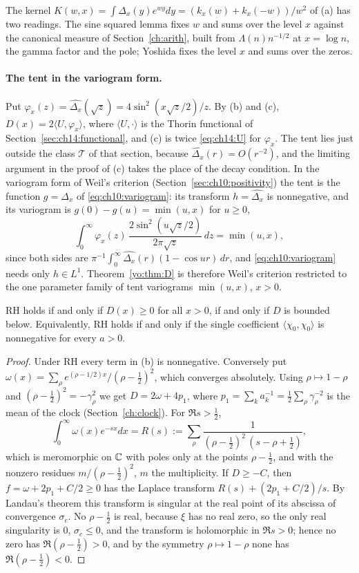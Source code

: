 The kernel $K(w,x)=\int\Delta_x(y)e^{wy}dy=(k_x(w)+k_x(-w))/w^2$ of (a) has two readings. The sine squared lemma fixes $w$ and sums over the level $x$ against the canonical measure of Section~\ref{ch:arith}, built from $\Lambda(n)n^{-1/2}$ at $x=\log n$, the gamma factor and the pole; Yoshida fixes the level $x$ and sums over the zeros.

\paragraph{The tent in the variogram form.} Put $\varphi_x(z)=\widehat{\Delta_x}(\sqrt z)=4\sin^2(x\sqrt z/2)/z$. By (b) and (c), $D(x)=2\langle U,\varphi_x\rangle$, where $\langle U,\cdot\rangle$ is the Thorin functional of Section~\ref{sec:ch14:functional}, and (c) is twice \eqref{eq:ch14:U} for $\varphi_x$. The tent lies just outside the class $\mathcal T$ of that section, because $\widehat{\Delta_x}(r)=O(r^{-2})$, and the limiting argument in the proof of (c) takes the place of the decay condition. In the variogram form of Weil's criterion (Section~\ref{sec:ch10:positivity}) the tent is the function $g=\Delta_x$ of \eqref{eq:ch10:variogram}: its transform $h=\widehat{\Delta_x}$ is nonnegative, and its variogram is $g(0)-g(u)=\min(u,x)$ for $u\ge0$,
\[
\int_0^\infty\varphi_x(z)\,\frac{2\sin^2(u\sqrt z/2)}{2\pi\sqrt z}\,dz=\min(u,x),
\]
since both sides are $\pi^{-1}\int_0^\infty\widehat{\Delta_x}(r)(1-\cos ur)\,dr$, and \eqref{eq:ch10:variogram} needs only $h\in L^1$. Theorem~\ref{yo:thm:D} is therefore Weil's criterion restricted to the one parameter family of tent variograms $\min(u,x)$, $x>0$.

\begin{theorem}\label{yo:thm:D}
RH holds if and only if $D(x)\ge0$ for all $x>0$, if and only if $D$ is bounded below. Equivalently, RH holds if and only if the single coefficient $\langle\chi_0,\chi_0\rangle$ is nonnegative for every $a>0$.
\end{theorem}

\begin{proof}
Under RH every term in (b) is nonnegative. Conversely put $\omega(x)=\sum_\rho e^{(\rho-1/2)x}/(\rho-\frac12)^2$, which converges absolutely. Using $\rho\mapsto1-\rho$ and $(\rho-\frac12)^2=-\gamma_\rho^2$ we get $D=2\omega+4p_1$, where $p_1=\sum_ka_k^{-1}=\frac12\sum_\rho\gamma_\rho^{-2}$ is the mean of the clock (Section~\ref{ch:clock}). For $\Re s>\frac12$,
\[
\int_0^\infty\omega(x)e^{-sx}dx=R(s):=\sum_\rho\frac1{(\rho-\frac12)^2\,(s-\rho+\frac12)},
\]
which is meromorphic on $\mathbb{C}$ with poles only at the points $\rho-\frac12$, and with the nonzero residues $m/(\rho-\frac12)^2$, $m$ the multiplicity. If $D\ge-C$, then $f=\omega+2p_1+C/2\ge0$ has the Laplace transform $R(s)+(2p_1+C/2)/s$. By Landau's theorem \cite[Chapter~II, Theorem~5b]{Widder41} this transform is singular at the real point of its abscissa of convergence $\sigma_c$. No $\rho-\frac12$ is real, because $\xi$ has no real zero, so the only real singularity is $0$, $\sigma_c\le0$, and the transform is holomorphic in $\Re s>0$; hence no zero has $\Re(\rho-\frac12)>0$, and by the symmetry $\rho\mapsto1-\rho$ none has $\Re(\rho-\frac12)<0$.
\end{proof}

